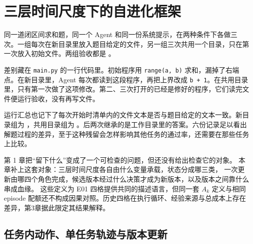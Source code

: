 \chapter{三层时间尺度下的自进化框架}
\label{ch02}


\begin{failurebox}
同一道闭区间求和题，同一个 Agent 和同一份系统提示，在两种条件下各做三次。一组每次在新目录里放入题目给定的文件，另一组三次共用一个目录，只在第一次放入初始文件。两组验收都是 。

差别藏在 \texttt{main.py} 的一行代码里。初始程序用 \texttt{range(a, b)} 求和，漏掉了右端点。在新目录里，Agent 每次都读到这段程序，再把上界改成 \texttt{b + 1}。在共用目录里，只有第一次做了这项修改。第二、三次打开的已经是修好的程序，它们读完文件便运行验收，没有再写文件。

运行汇总也记下了每次开始时清单内的文件文本是否与题目给定的文本一致。新目录组为 ，共用目录组为 。后两次继承的是工作目录里的答案。六份记录足以看出解题过程的差异，至于这种残留会怎样影响其他任务的通过率，还需要在那些任务上比较。
\end{failurebox}


第 1 章把“留下什么”变成了一个可检查的问题，但还没有给出检查它的对象。
本章补上这套对象：三层时间尺度各自由什么变量承载，状态分成哪三类，
一次更新由哪四个角色完成，候选版本经过什么决策才成为新版本，以及版本之间靠什么串成血缘。
这些定义为 E01 四格提供共同的描述语言，但同一套 $A_k$ 定义与相同 episode 配额还不构成因果对照。历史四格在执行循环、经验来源与总成本上存在差异，第3章据此限定其结果解释。

\section{任务内动作、单任务轨迹与版本更新}
\label{sec:ch02-layers}

